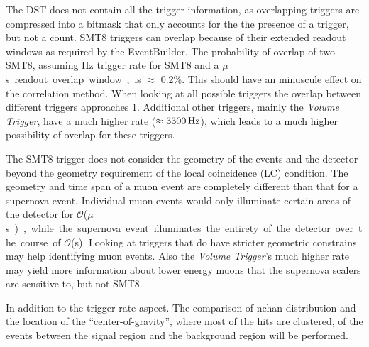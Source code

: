 The DST does not contain all the trigger information, as overlapping triggers are compressed into a bitmask that only accounts for the the presence of a trigger, but not a count. SMT8 triggers can overlap because of their extended readout windows as required by the EventBuilder. The probability of overlap of two SMT8, assuming \unit[2100]{Hz} trigger rate for SMT8 and a \unit[10]{$\mu$s} readout overlap window, is $\approx$ 0.2\%. This should have an minuscule effect on the correlation method. When looking at all possible triggers the overlap between different triggers approaches 1. Additional other triggers, mainly the \emph{Volume Trigger}, have a much higher rate ($\approx \unit[3300]{Hz}$), which leads to a much higher possibility of overlap for these triggers. 

The SMT8 trigger does not consider the geometry of the events and the detector beyond the geometry requirement of the local coincidence (LC) condition. The geometry and time span of a muon event are completely different than that for a supernova event. Individual muon events would only illuminate certain areas of the detector for $\mathcal{O}$(\unit[1 - 10]{$\mu$s}), while the supernova event illuminates the entirety of the detector over the course of $\mathcal{O}$(\unit[1 - 10]{s}). Looking at triggers that do have stricter geometric constrains may help identifying muon events. Also the \emph{Volume Trigger}'s much higher rate may yield more information about lower energy muons that the supernova scalers are sensitive to, but not SMT8. 

In addition to the trigger rate aspect. The comparison of nchan distribution and the location of the ``center-of-gravity'', where most of the hits are clustered, of the events between the signal region and the background region will be performed. 


